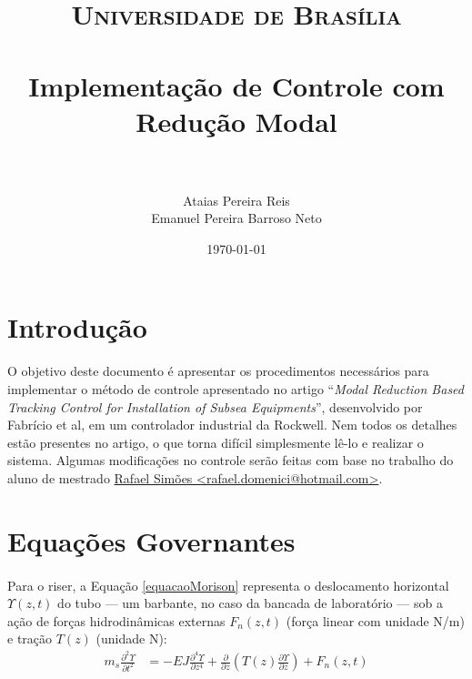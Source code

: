 \documentclass[a4paper,11pt]{scrartcl} %
\title{	
\normalfont \normalsize 
\textsc{Universidade de Brasília} \\ [25pt] %
\horrule{0.5pt} \\[0.4cm] %
\huge Implementação de Controle com Redução Modal \\ %
\horrule{2pt} \\[0.5cm] %
}
\author{Ataias Pereira Reis \\ Emanuel Pereira Barroso Neto} %
\date{\normalsize\today} %
\numberwithin{equation}{section} %
\numberwithin{figure}{section} %
\numberwithin{table}{section} %
\begin{document}
\maketitle %


\section{Introdução}
\paragraph{} O objetivo deste documento é apresentar os procedimentos necessários para implementar o método de controle apresentado no artigo ``\textit{Modal Reduction Based Tracking Control for Installation of Subsea Equipments}'', desenvolvido por Fabrício et al, em um controlador industrial da Rockwell. Nem todos os detalhes estão presentes no artigo, o que torna difícil simplesmente lê-lo e realizar o sistema. Algumas modificações no controle serão feitas com base no trabalho do aluno de mestrado  \href{mailto:rafael.domenici@hotmail.com}{Rafael Simões <rafael.domenici@hotmail.com>}.

\section{Equações Governantes}
\paragraph{} Para o riser, a Equação \ref{equacaoMorison} representa o deslocamento horizontal $\Upsilon(z,t)$ do tubo --- um barbante, no caso da bancada de laboratório --- sob a ação de forças hidrodinâmicas externas $F_n(z,t)$ (força linear com unidade N/m) e tração $T(z)$ (unidade N): \begin{align}
	m_s \frac{\partial^2 \Upsilon}{\partial t^2} &= -EJ \frac{\partial^4 \Upsilon}{\partial z^4} + 	\frac{\partial}{\partial z}\left(T(z)\frac{\partial \Upsilon}{\partial z}\right)+F_n(z,t) \label{equacaoMorison}
\end{align}
\end{document}
